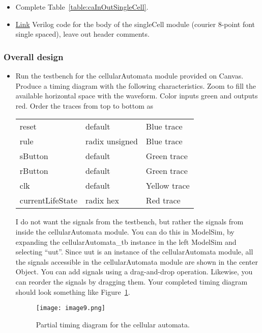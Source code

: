 \begin{itemize}
\item
  Complete Table~\ref{table:caInOutSingleCell}.
\item
  \protect\hyperlink{singleCell_verilog}{Link} Verilog code for the body
  of the singleCell module (courier 8-point font single spaced), leave
  out header comments.
\end{itemize}

\subsubsection{Overall design}

\begin{itemize}
\item
  Run the testbench for the cellularAutomata module provided on Canvas.
  Produce a timing diagram with the following characteristics. Zoom to
  fill the available horizontal space with the waveform. Color inputs
  green and outputs red. Order the traces from top to bottom as

\begin{tabular}{p{4cm}p{4cm}p{4cm}}
    reset 			& default 		& Blue trace \\ 
    rule 			& radix unsigned & Blue trace\\ 
    sButton 			& default 		& Green trace\\ 
    rButton 			& default 		& Green trace\\ 
    clk 				& default 		& Yellow trace\\ 
    currentLifeState 	&radix hex 		& Red trace\\
  \end{tabular}


I do not want the signals from the testbench, but rather the signals
from inside the cellularAutomata module. You can do this in ModelSim, by
expanding the cellularAutomata\_tb instance in the left ModelSim and
selecting ``uut''. Since uut is an instance of the cellularAutomata
module, all the signals accessible in the cellularAutomata module are
shown in the center Object. You can add signals using a drag-and-drop
operation. Likewise, you can reorder the signals by dragging them. Your
completed timing diagram should look something like Figure~\ref{fig:caTimeDiag}.

\begin{figure}
\texttt{[image: image9.png]}
\caption{Partial timing diagram for the cellular automata.}
\label{fig:caTimeDiag}
\end{figure}
\end{itemize}